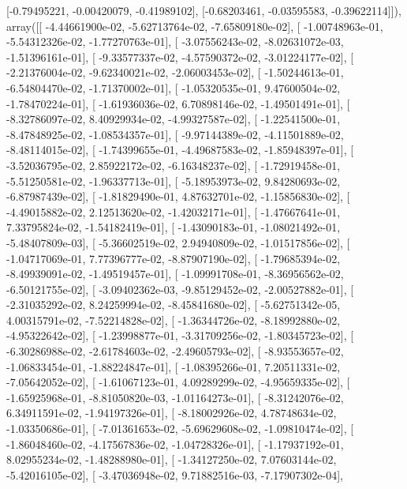 \documentclass{article}
\begin{document}
       [-0.79495221, -0.00420079, -0.41989102],
       [-0.68203461, -0.03595583, -0.39622114]]), array([[ -4.44661900e-02,  -5.62713764e-02,  -7.65809180e-02],
       [ -1.00748963e-01,  -5.54312326e-02,  -1.77270763e-01],
       [ -3.07556243e-02,  -8.02631072e-03,  -1.51396161e-01],
       [ -9.33577337e-02,  -4.57590372e-02,  -3.01224177e-02],
       [ -2.21376004e-02,  -9.62340021e-02,  -2.06003453e-02],
       [ -1.50244613e-01,  -6.54804470e-02,  -1.71370002e-01],
       [ -1.05320535e-01,   9.47600504e-02,  -1.78470224e-01],
       [ -1.61936036e-02,   6.70898146e-02,  -1.49501491e-01],
       [ -8.32786097e-02,   8.40929934e-02,  -4.99327587e-02],
       [ -1.22541500e-01,  -8.47848925e-02,  -1.08534357e-01],
       [ -9.97144389e-02,  -4.11501889e-02,  -8.48114015e-02],
       [ -1.74399655e-01,  -4.49687583e-02,  -1.85948397e-01],
       [ -3.52036795e-02,   2.85922172e-02,  -6.16348237e-02],
       [ -1.72919458e-01,  -5.51250581e-02,  -1.96337713e-01],
       [ -5.18953973e-02,   9.84280693e-02,  -6.87987439e-02],
       [ -1.81829490e-01,   4.87632701e-02,  -1.15856830e-02],
       [ -4.49015882e-02,   2.12513620e-02,  -1.42032171e-01],
       [ -1.47667641e-01,   7.33795824e-02,  -1.54182419e-01],
       [ -1.43090183e-01,  -1.08021492e-01,  -5.48407809e-03],
       [ -5.36602519e-02,   2.94940809e-02,  -1.01517856e-02],
       [ -1.04717069e-01,   7.77396777e-02,  -8.87907190e-02],
       [ -1.79685394e-02,  -8.49939091e-02,  -1.49519457e-01],
       [ -1.09991708e-01,  -8.36956562e-02,  -6.50121755e-02],
       [ -3.09402362e-03,  -9.85129452e-02,  -2.00527882e-01],
       [ -2.31035292e-02,   8.24259994e-02,  -8.45841680e-02],
       [ -5.62751342e-05,   4.00315791e-02,  -7.52214828e-02],
       [ -1.36344726e-02,  -8.18992880e-02,  -4.95322642e-02],
       [ -1.23998877e-01,  -3.31709256e-02,  -1.80345723e-02],
       [ -6.30286988e-02,  -2.61784603e-02,  -2.49605793e-02],
       [ -8.93553657e-02,  -1.06833454e-01,  -1.88224847e-01],
       [ -1.08395266e-01,   7.20511331e-02,  -7.05642052e-02],
       [ -1.61067123e-01,   4.09289299e-02,  -4.95659335e-02],
       [ -1.65925968e-01,  -8.81050820e-03,  -1.01164273e-01],
       [ -8.31242076e-02,   6.34911591e-02,  -1.94197326e-01],
       [ -8.18002926e-02,   4.78748634e-02,  -1.03350686e-01],
       [ -7.01361653e-02,  -5.69629608e-02,  -1.09810474e-02],
       [ -1.86048460e-02,  -4.17567836e-02,  -1.04728326e-01],
       [ -1.17937192e-01,   8.02955234e-02,  -1.48288980e-01],
       [ -1.34127250e-02,   7.07603144e-02,  -5.42016105e-02],
       [ -3.47036948e-02,   9.71882516e-03,  -7.17907302e-04],
\end{document}
